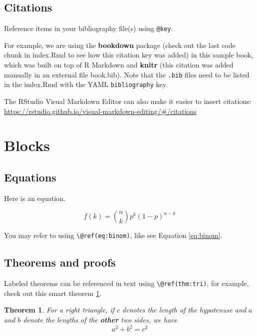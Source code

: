 \documentclass[
]{book}
\newtheorem{theorem}{Theorem}[chapter]
\theoremstyle{definition}
\theoremstyle{definition}
\theoremstyle{definition}
\theoremstyle{definition}
\theoremstyle{remark}
\begin{document}
\hypertarget{citations}{%
\subsection{Citations}\label{citations}}

Reference items in your bibliography file(s) using \texttt{@key}.

For example, we are using the \textbf{bookdown} package \citep{R-bookdown} (check out the last code chunk in index.Rmd to see how this citation key was added) in this sample book, which was built on top of R Markdown and \textbf{knitr} \citep{xie2015} (this citation was added manually in an external file book.bib).
Note that the \texttt{.bib} files need to be listed in the index.Rmd with the YAML \texttt{bibliography} key.

The RStudio Visual Markdown Editor can also make it easier to insert citations: \url{https://rstudio.github.io/visual-markdown-editing/\#/citations}

\hypertarget{blocks}{%
\section{Blocks}\label{blocks}}

\hypertarget{equations}{%
\subsection{Equations}\label{equations}}

Here is an equation.

\begin{equation} 
  f\left(k\right) = \binom{n}{k} p^k\left(1-p\right)^{n-k}
  \label{eq:binom}
\end{equation}

You may refer to using \texttt{\textbackslash{}@ref(eq:binom)}, like see Equation \eqref{eq:binom}.

\hypertarget{theorems-and-proofs}{%
\subsection{Theorems and proofs}\label{theorems-and-proofs}}

Labeled theorems can be referenced in text using \texttt{\textbackslash{}@ref(thm:tri)}, for example, check out this smart theorem \ref{thm:tri}.

\begin{theorem}
\protect\hypertarget{thm:tri}{}\label{thm:tri}For a right triangle, if \(c\) denotes the \emph{length} of the hypotenuse
and \(a\) and \(b\) denote the lengths of the \textbf{other} two sides, we have
\[a^2 + b^2 = c^2\]
\end{theorem}
\end{document}
